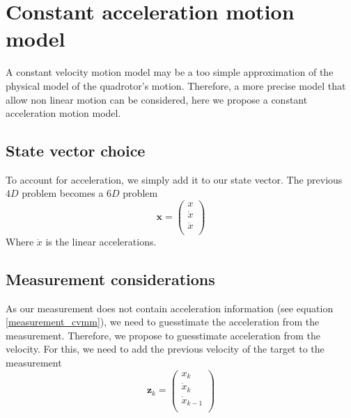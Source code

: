 \documentclass[12pt]{article}
\begin{document}
\section{Constant acceleration motion model}
A constant velocity motion model may be a too simple approximation of the physical model of the quadrotor's motion.
Therefore, a more precise model that allow non linear motion can be considered, here we propose a constant acceleration motion model.

\subsection{State vector choice}
To account for acceleration, we simply add it to our state vector.
The previous $4D$ problem becomes a $6D$ problem
\begin{equation}
\mathbf{x} =
    \begin{pmatrix}
        x\\
        \dot{x}\\
        \ddot{x}\\
    \end{pmatrix}
\end{equation}
Where $\ddot{x}$ is the linear accelerations.

\subsection{Measurement considerations}
As our measurement does not contain acceleration information (see equation \ref{measurement_cvmm}), we need to guesstimate the acceleration from the measurement.
Therefore, we propose to guesstimate acceleration from the velocity.
For this, we need to add the previous velocity of the target to the measurement
\begin{equation}
\mathbf{z}_k =
    \begin{pmatrix}
        x_k\\
        \dot{x}_k\\
        \dot{x}_{k-1}\\
    \end{pmatrix}
\label{measurement_cvmm}
\end{equation}
\end{document}
